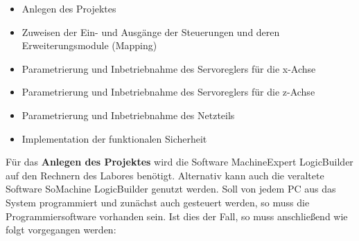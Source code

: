 \documentclass[../../../Bachelorarbeit.tex]{subfiles}
\begin{document}
\begin{itemize}
    \item Anlegen des Projektes
    \item Zuweisen der Ein- und Ausgänge der Steuerungen und deren Erweiterungsmodule (\eng Mapping)
    \item Parametrierung und Inbetriebnahme des Servoreglers für die x-Achse
    \item Parametrierung und Inbetriebnahme des Servoreglers für die z-Achse
    \item Parametrierung und Inbetriebnahme des Netzteils
    \item Implementation der funktionalen Sicherheit
\end{itemize}

Für das \textbf{Anlegen des Projektes} wird die Software MachineExpert LogicBuilder auf den Rechnern des Labores benötigt. Alternativ kann auch die veraltete Software SoMachine LogicBuilder genutzt werden. Soll von jedem PC aus das System programmiert und zunächst auch gesteuert werden, so muss die Programmiersoftware vorhanden sein. Ist dies der Fall, so muss anschließend wie folgt vorgegangen werden:
\end{document}
